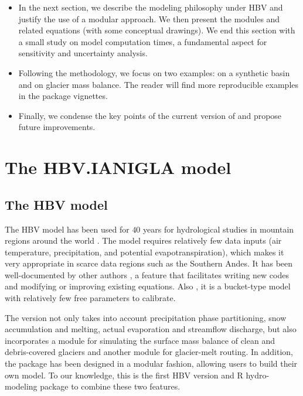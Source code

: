 \begin{itemize}
	\item In the next section, we describe the modeling philosophy under HBV and justify the use of a modular approach. 
	We then present the  modules and related equations (with some conceptual drawings).
	We end this section with a small study on model computation times, a fundamental aspect for sensitivity and 
	uncertainty analysis.
	\item Following the methodology, we focus on two examples: on a synthetic basin and on glacier mass balance.  
	The reader will find more reproducible examples in the package vignettes.
	\item Finally, we condense the key points of the current version of  and propose future improvements.
\end{itemize}

\section{The HBV.IANIGLA model}

\subsection{The HBV model}

The HBV model has been used for $40$ years for hydrological studies in mountain 
regions around the world \citep{bergstrom:2015}. The model requires relatively few data inputs (air temperature,
precipitation, and potential evapotranspiration),  which makes it very appropriate in scarce data regions such
as the Southern Andes. It has been well-documented by other authors \citep{seibert:2012, parajka:2008, stahl_hbv:2008}, 
a feature that facilitates writing new codes and modifying or improving existing equations. Also	, it is a bucket-type 
model with relatively few free parameters to calibrate. 

The  version not only takes into account precipitation phase partitioning, snow accumulation and melting, actual
evaporation and streamflow discharge, but also incorporates a module for simulating the surface mass balance of clean and 
debris-covered glaciers and another module for glacier-melt routing. In addition, the package has been designed in a modular
fashion, allowing users to build their own model. To our knowledge, this is the first HBV version and R hydro-modeling package 
to combine these two features.


